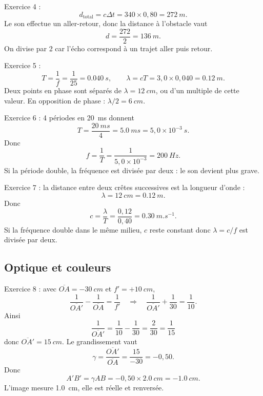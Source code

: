 \documentclass[11pt,a4paper]{article}
\begin{document}
\begin{corrbox}
Exercice 4 :
\[
 d_{\text{total}}=c\Delta t = 340\times 0{,}80 = \SI{272}{m}.
\]
Le son effectue un aller-retour, donc la distance à l'obstacle vaut
\[
 d=\frac{272}{2}=\SI{136}{m}.
\]
On divise par 2 car l'écho correspond à un trajet aller puis retour.
\end{corrbox}

\begin{corrbox}
Exercice 5 :
\[
T=\frac{1}{f}=\frac{1}{25}=\SI{0,040}{s},\qquad \lambda = cT = 3{,}0\times 0{,}040 = \SI{0,12}{m}.
\]
Deux points en phase sont séparés de $\lambda=\SI{12}{cm}$, ou d'un multiple de cette valeur. En opposition de phase : $\lambda/2=\SI{6}{cm}$.
\end{corrbox}

\begin{corrbox}
Exercice 6 :
4 périodes en \SI{20}{ms} donnent
\[
T=\frac{20\ \si{ms}}{4}=\SI{5,0}{ms}=5{,}0\times10^{-3}\ \si{s}.
\]
Donc
\[
f=\frac{1}{T}=\frac{1}{5{,}0\times10^{-3}}=\SI{200}{Hz}.
\]
Si la période double, la fréquence est divisée par deux : le son devient plus grave.
\end{corrbox}

\begin{corrbox}
Exercice 7 : la distance entre deux crêtes successives est la longueur d'onde :
\[
\lambda = \SI{12}{cm}=\SI{0,12}{m}.
\]
Donc
\[
c=\frac{\lambda}{T}=\frac{0{,}12}{0{,}40}=\SI{0,30}{m.s^{-1}}.
\]
Si la fréquence double dans le même milieu, $c$ reste constant donc $\lambda = c/f$ est divisée par deux.
\end{corrbox}

\subsection*{Optique et couleurs}
\begin{corrbox}
Exercice 8 : avec $\overline{OA}=-\SI{30}{cm}$ et $f'=+\SI{10}{cm}$,
\[
\frac{1}{\overline{OA'}}-\frac{1}{\overline{OA}}=\frac{1}{f'}
\quad\Longrightarrow\quad
\frac{1}{\overline{OA'}}+\frac{1}{30}=\frac{1}{10}.
\]
Ainsi
\[
\frac{1}{\overline{OA'}}=\frac{1}{10}-\frac{1}{30}=\frac{2}{30}=\frac{1}{15}
\]
donc $\overline{OA'}=\SI{15}{cm}$.
Le grandissement vaut
\[
\gamma=\frac{\overline{OA'}}{\overline{OA}}=\frac{15}{-30}=-0{,}50.
\]
Donc
\[
A'B' = \gamma AB = -0{,}50\times \SI{2,0}{cm} = -\SI{1,0}{cm}.
\]
L'image mesure \SI{1,0}{cm}, elle est réelle et renversée.
\end{corrbox}
\end{document}
